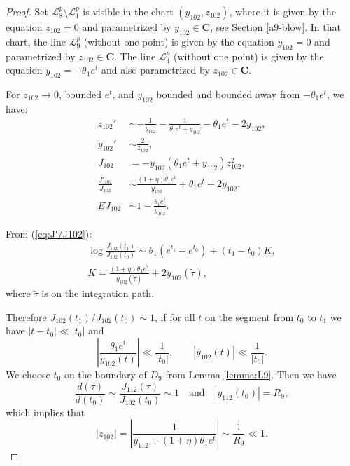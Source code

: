  \begin{proof}
 Set $\mathcal{L}_8^p\setminus\mathcal{L}_1^p$ is visible in the chart $(y_{102},z_{102})$, where it is given by the equation $z_{102}=0$ and parametrized by $y_{102}\in\mathbf{C}$, see Section \ref{a9-blow}.
 In that chart, the line $\mathcal{L}_9^p$ (without one point) is given by the equation $y_{102}=0$ and parametrized by $z_{102}\in\mathbf{C}$.
 The line $\mathcal{L}_4^p$ (without one point) is given by the equation $y_{102}=-\theta_1 e^t$ and also parametrized by $z_{102}\in\mathbf{C}$.
 
For $z_{102}\to0$, bounded $e^t$, and $y_{102}$ bounded and bounded away from $-\theta_1 e^t$, we have:
\begin{subequations}
\begin{align}
z_{102}' &\sim-\frac{1}{y_{102}}-\frac{1}{\theta_1e^t+y_{102}}-\theta_1e^t-2y_{102},\label{eq:z102'}
\\
y_{102}' &\sim\frac{2}{z_{102}},\label{eq:y102'}
\\
J_{102} &=-y_{102}(\theta_1 e^t +y_{102}) z_{102}^2,\label{eq:J102}
\\
\frac{J'_{102}}{J_{102}} & \sim \frac{(1+\eta)\theta_1 e^t}{y_{102}}+\theta_1 e^t+2y_{102},\label{eq:J'/J102}
\\
E J_{102} & \sim 1-\frac{\theta_1 e^t}{y_{102}}.\label{eq:EJ102}
\end{align}
\end{subequations}


From (\ref{eq:J'/J102}):
\begin{gather*}
\log\frac{J_{102}(t_1)}{J_{102}(t_0)}
\sim
\theta_1(e^{t_1}-e^{t_0})+(t_1-t_0)K,
\\
K=\frac{(1+\eta)\theta_1 e^{\tilde\tau}}{y_{102}(\tilde\tau)}+2y_{102}(\tilde\tau),
\end{gather*}
where $\tilde\tau$ is on the integration path.

Therefore $J_{102}(t_1)/J_{102}(t_0)\sim1$, if for all $t$ on the segment from $t_0$ to $t_1$ we have $|t-t_0|\ll|t_0|$ and
$$
\left|\frac{\theta_1 e^t}{y_{102}(t)}\right|\ll\frac1{|t_0|},
\qquad
|y_{102}(t)|\ll\frac1{|t_0|}.
$$
We choose $t_0$ on the boundary of $D_9$ from Lemma \ref{lemma:L9}.
Then we have
$$
\frac{d(\tau)}{d(t_0)}\sim \frac{J_{112}(\tau)}{J_{102}(t_0)}\sim1
\quad\text{and}\quad
|y_{112}(t_0)|=R_9,
$$
which implies that
$$
|z_{102}|=\left|\frac{1}{y_{112}+(1+\eta)\theta_1 e^t}\right|\sim\frac1{R_9}\ll 1.
$$



\end{proof}
